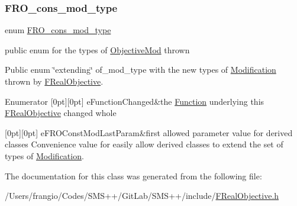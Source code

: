 \subsubsection{\texorpdfstring{F\+R\+O\+\_\+cons\+\_\+mod\+\_\+type}{FRO\_cons\_mod\_type}}
{\footnotesize\ttfamily enum \mbox{\hyperlink{class_s_m_spp__di__unipi__it_1_1_f_real_objective_mod_a10f9cfdc831c025f33e97e51a22e32a3}{F\+R\+O\+\_\+cons\+\_\+mod\+\_\+type}}}



public enum for the types of \mbox{\hyperlink{class_s_m_spp__di__unipi__it_1_1_objective_mod}{Objective\+Mod}} thrown 

Public enum \char`\"{}extending\char`\"{} of\+\_\+mod\+\_\+type with the new types of \mbox{\hyperlink{class_s_m_spp__di__unipi__it_1_1_modification}{Modification}} thrown by \mbox{\hyperlink{class_s_m_spp__di__unipi__it_1_1_f_real_objective}{F\+Real\+Objective}}. \begin{DoxyEnumFields}{Enumerator}
[0pt][0pt]{}\mbox{\label{class_s_m_spp__di__unipi__it_1_1_f_real_objective_mod_a10f9cfdc831c025f33e97e51a22e32a3a2d56f392a43ca0db9b27247c7d60b944}} 
e\+Function\+Changed&the \mbox{\hyperlink{class_s_m_spp__di__unipi__it_1_1_function}{Function}} underlying this \mbox{\hyperlink{class_s_m_spp__di__unipi__it_1_1_f_real_objective}{F\+Real\+Objective}} changed whole \\
\hline

[0pt][0pt]{}\mbox{\label{class_s_m_spp__di__unipi__it_1_1_f_real_objective_mod_a10f9cfdc831c025f33e97e51a22e32a3a1917a45d723393f53d6a8b8eace4d77a}} 
e\+F\+R\+O\+Const\+Mod\+Last\+Param&first allowed parameter value for derived classes Convenience value for easily allow derived classes to extend the set of types of \mbox{\hyperlink{class_s_m_spp__di__unipi__it_1_1_modification}{Modification}}. \\
\hline

\end{DoxyEnumFields}


The documentation for this class was generated from the following file\+:\begin{DoxyCompactItemize}
\item 
/\+Users/frangio/\+Codes/\+S\+M\+S++/\+Git\+Lab/\+S\+M\+S++/include/\mbox{\hyperlink{_f_real_objective_8h}{F\+Real\+Objective.\+h}}\end{DoxyCompactItemize}
